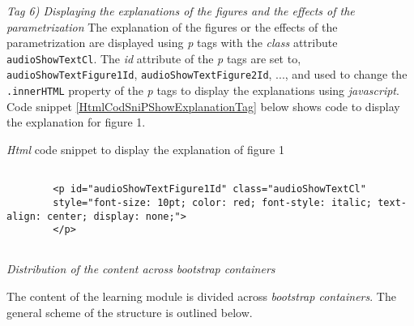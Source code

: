 \documentclass[12pt]{article}
\begin{document}

\vspace{1em}
\noindent\emph{Tag 6) Displaying the explanations of the figures and the effects of the parametrization}
%
The explanation of the figures or the effects of the parametrization are displayed using \emph{p} tags with the \emph{class} attribute \texttt{audioShowTextCl}. 
%
The \emph{id} attribute of the \emph{p} tags are set to, \texttt{audioShowTextFigure1Id}, \texttt{audioShowTextFigure2Id}, ..., and used to change the \texttt{.innerHTML} property of the \emph{p} tags to display the explanations using \emph{javascript}. 
%
Code snippet \ref{HtmlCodSniPShowExplanationTag} below shows code to display the explanation for figure 1. 
%
\begin{CodeSnippet}[!hp]
	\centering
	\caption{\emph{Html} code snippet to display the explanation of figure 1}
	\footnotesize
	\vspace{0.25cm}
	\begin{BVerbatim}
		
		<p id="audioShowTextFigure1Id" class="audioShowTextCl"
		style="font-size: 10pt; color: red; font-style: italic; text-align: center; display: none;">
		</p>
		
	\end{BVerbatim}
	\label{HtmlCodSniPShowExplanationTag}
\end{CodeSnippet}


\vspace{1em}
\noindent\emph{Distribution of the content across bootstrap containers}

The content of the learning module is divided across \emph{bootstrap containers}. 
%
The general scheme of the structure is outlined below. 
\end{document}

